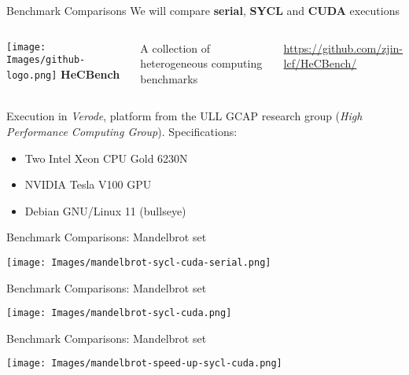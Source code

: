 \begin{frame}{Benchmark Comparisons}
  We will compare \textbf{serial}, \textbf{SYCL} and \textbf{CUDA} executions
\begin{block}{}
\begin{columns}[onlytextwidth]
  \column{12mm}
  \texttt{[image: Images/github-logo.png]}
  \column{\linewidth}
  {\large\textbf{HeCBench}}
  
  A collection of heterogeneous computing benchmarks

  \url{https://github.com/zjin-lcf/HeCBench/}
\end{columns}
\end{block}
Execution in \textit{Verode}, platform from the ULL GCAP research group (\textit{High
Performance Computing Group}). Specifications:
\begin{itemize}
  \item Two Intel\textsuperscript{\textregistered} Xeon\textsuperscript{\textregistered} CPU Gold 6230N
  \item NVIDIA Tesla V100 GPU
  \item Debian GNU/Linux 11 (bullseye)
\end{itemize}
\end{frame}
\begin{frame}{Benchmark Comparisons: Mandelbrot set}
  \begin{center}
  \texttt{[image: Images/mandelbrot-sycl-cuda-serial.png]}
  \end{center}
\end{frame}
\begin{frame}{Benchmark Comparisons: Mandelbrot set}
  \begin{center}
  \texttt{[image: Images/mandelbrot-sycl-cuda.png]}
  \end{center}
\end{frame}
\begin{frame}{Benchmark Comparisons: Mandelbrot set}
  \begin{center}
  \texttt{[image: Images/mandelbrot-speed-up-sycl-cuda.png]}
  \end{center}
\end{frame}
